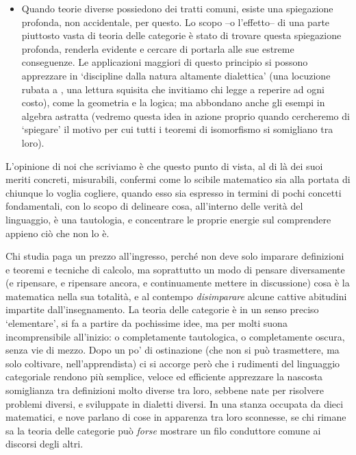 \begin{itemize}
 In questo senso, la matematica deve essere ispirata a un canone simile a quello che orienta la scrittura di `buon' codice quando si programma un algoritmo. Tutti sono capaci di scrivere una funzione che calcola un fattoriale; già meno persone sono capaci di farlo tenendo d'occhio il costo computazionale, la leggibilità, la mantenibilità della teoria/libreria dove quel teorema/codice è immerso. Tutti sono capaci di dimostrare un teorema, già meno persone\dots
 \item Quando teorie diverse possiedono dei tratti comuni, esiste una spiegazione profonda, non accidentale, per questo. Lo scopo --o l'effetto-- di una parte piuttosto vasta di teoria delle categorie è stato di trovare questa spiegazione profonda, renderla evidente e cercare di portarla alle sue estreme conseguenze. Le applicazioni maggiori di questo principio si possono apprezzare in `discipline dalla natura altamente dialettica' (una locuzione rubata a \cite{lawvere1999profilo}, una lettura squisita che invitiamo chi legge a reperire ad ogni costo), come la geometria e la logica; ma abbondano anche gli esempi in algebra astratta (vedremo questa idea in azione proprio quando cercheremo di `spiegare' il motivo per cui tutti i teoremi di isomorfismo si somigliano tra loro).
\end{itemize}
L'opinione di noi che scriviamo è che questo punto di vista, al di là dei suoi meriti concreti, misurabili, confermi come lo scibile matematico sia alla portata di chiunque lo voglia cogliere, quando esso sia espresso in termini di pochi concetti fondamentali, con lo scopo di delineare cosa, all'interno delle verità del linguaggio, è una tautologia, e concentrare le proprie energie sul comprendere appieno ciò che non lo è.

Chi studia paga un prezzo all'ingresso, perché non deve solo imparare definizioni e teoremi e tecniche di calcolo, ma soprattutto un modo di pensare diversamente (e ripensare, e ripensare ancora, e continuamente mettere in discussione) cosa è la matematica nella sua totalità, e al contempo \emph{disimparare} alcune cattive abitudini impartite dall'insegnamento. La teoria delle categorie è in un senso preciso `elementare', si fa a partire da pochissime idee, ma per molti suona incomprensibile all'inizio: o completamente tautologica, o completamente oscura, senza vie di mezzo. Dopo un po' di ostinazione (che non si può trasmettere, ma solo coltivare, nell'apprendista) ci si accorge però che i rudimenti del linguaggio categoriale rendono più semplice, veloce ed efficiente apprezzare la nascosta somiglianza tra definizioni molto diverse tra loro, sebbene nate per risolvere problemi diversi, e sviluppate in dialetti diversi. In una stanza occupata da dieci matematici, e nove parlano di cose in apparenza tra loro sconnesse, se chi rimane sa la teoria delle categorie può \emph{forse} mostrare un filo conduttore comune ai discorsi degli altri.

